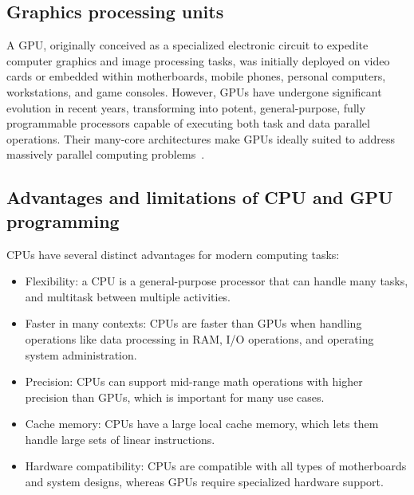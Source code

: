 

\subsection{Graphics processing units}


\par

A GPU, originally conceived as a specialized electronic circuit to expedite computer graphics and image processing tasks, was initially deployed on video cards or embedded within motherboards, mobile phones, personal computers, workstations, and game consoles. However, GPUs have undergone significant evolution in recent years, transforming into potent, general-purpose, fully programmable processors capable of executing both task and data parallel operations. Their many-core architectures make GPUs ideally suited to address massively parallel computing problems~\cite{gpu_wiki}.




\subsection{Advantages and limitations of CPU and GPU programming}


\par
CPUs have several distinct advantages for modern computing tasks:
\begin{itemize}
    \item Flexibility: a CPU is a general-purpose processor that can handle many tasks, and multitask between multiple activities.
    \item Faster in many contexts: CPUs are faster than GPUs when handling operations like data processing in RAM, I/O operations, and operating system administration.
    \item Precision: CPUs can support mid-range math operations with higher precision than GPUs, which is important for many use cases.
    \item Cache memory: CPUs have a large local cache memory, which lets them handle large sets of linear instructions.
    \item Hardware compatibility: CPUs are compatible with all types of motherboards and system designs, whereas GPUs require specialized hardware support.
\end{itemize}


